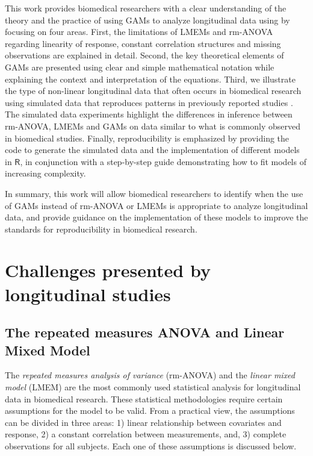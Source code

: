 \documentclass[Royal,times,sagev]{sagej}
\begin{document}
This work provides biomedical researchers with a clear understanding of
the theory and the practice of using GAMs to analyze longitudinal data
using by focusing on four areas. First, the limitations of LMEMs and
rm-ANOVA regarding linearity of response, constant correlation
structures and missing observations are explained in detail. Second, the
key theoretical elements of GAMs are presented using clear and simple
mathematical notation while explaining the context and interpretation of
the equations. Third, we illustrate the type of non-linear longitudinal
data that often occurs in biomedical research using simulated data that
reproduces patterns in previously reported studies
\citep{vishwanath2009}. The simulated data experiments highlight the
differences in inference between rm-ANOVA, LMEMs and GAMs on data
similar to what is commonly observed in biomedical studies. Finally,
reproducibility is emphasized by providing the code to generate the
simulated data and the implementation of different models in
\(\textsf{R}\), in conjunction with a step-by-step guide demonstrating
how to fit models of increasing complexity.

In summary, this work will allow biomedical researchers to identify when
the use of GAMs instead of rm-ANOVA or LMEMs is appropriate to analyze
longitudinal data, and provide guidance on the implementation of these
models to improve the standards for reproducibility in biomedical
research.

\hypertarget{challenges-presented-by-longitudinal-studies}{%
\section{Challenges presented by longitudinal
studies}\label{challenges-presented-by-longitudinal-studies}}

\hypertarget{the-repeated-measures-anova-and-linear-mixed-model}{%
\subsection{The repeated measures ANOVA and Linear Mixed
Model}\label{the-repeated-measures-anova-and-linear-mixed-model}}

The \emph{repeated measures analysis of variance} (rm-ANOVA) and the
\emph{linear mixed model} (LMEM) are the most commonly used statistical
analysis for longitudinal data in biomedical research. These statistical
methodologies require certain assumptions for the model to be valid.
From a practical view, the assumptions can be divided in three areas: 1)
linear relationship between covariates and response, 2) a constant
correlation between measurements, and, 3) complete observations for all
subjects. Each one of these assumptions is discussed below.
\end{document}
